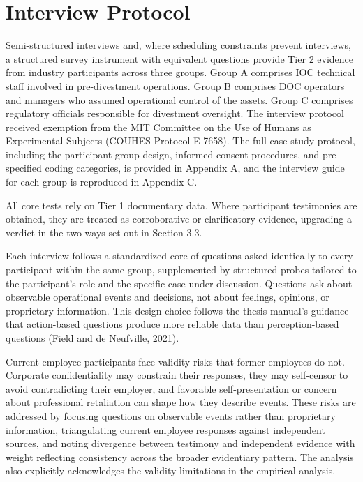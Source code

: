 \documentclass[twoside,fontset=lmodern]{mitthesis}
\begin{document}
\hypertarget{interview-protocol}{%
\section{Interview Protocol}\label{interview-protocol}}

Semi-structured interviews and, where scheduling constraints prevent
interviews, a structured survey instrument with equivalent questions
provide Tier 2 evidence from industry participants across three groups.
Group A comprises IOC technical staff involved in pre-divestment
operations. Group B comprises DOC operators and managers who assumed
operational control of the assets. Group C comprises regulatory
officials responsible for divestment oversight. The interview protocol
received exemption from the MIT Committee on the Use of Humans as
Experimental Subjects (COUHES Protocol E-7658). The full case study
protocol, including the participant-group design, informed-consent
procedures, and pre-specified coding categories, is provided in Appendix
A, and the interview guide for each group is reproduced in Appendix C.

All core tests rely on Tier 1 documentary data. Where participant
testimonies are obtained, they are treated as corroborative or
clarificatory evidence, upgrading a verdict in the two ways set out in
Section 3.3.

Each interview follows a standardized core of questions asked
identically to every participant within the same group, supplemented by
structured probes tailored to the participant's role and the specific
case under discussion. Questions ask about observable operational events
and decisions, not about feelings, opinions, or proprietary information.
This design choice follows the thesis manual's guidance that
action-based questions produce more reliable data than perception-based
questions (Field and de Neufville, 2021).

Current employee participants face validity risks that former employees
do not. Corporate confidentiality may constrain their responses, they
may self-censor to avoid contradicting their employer, and favorable
self-presentation or concern about professional retaliation can shape
how they describe events. These risks are addressed by focusing
questions on observable events rather than proprietary information,
triangulating current employee responses against independent sources,
and noting divergence between testimony and independent evidence with
weight reflecting consistency across the broader evidentiary pattern.
The analysis also explicitly acknowledges the validity limitations in
the empirical analysis.
\end{document}
